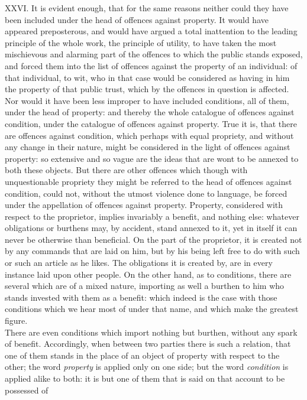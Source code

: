 \documentclass[12pt]{report}
\begin{document}
XXVI. It is evident enough, that for the same reasons neither could they
have been included under the head of offences against property. It would
have appeared preposterous, and would have argued a total inattention to
the leading principle of the whole work, the principle of utility, to
have taken the most mischievous and alarming part of the offences to
which the public stands exposed, and forced them into the list of
offences against the property of an individual: of that individual, to
wit, who in that case would be considered as having in him the property
of that public trust, which by the offences in question is affected.\\
Nor would it have been less improper to have included conditions, all of
them, under the head of property: and thereby the whole catalogue of
offences against condition, under the catalogue of offences against
property. True it is, that there are offences against condition, which
perhaps with equal propriety, and without any change in their nature,
might be considered in the light of offences against property: so
extensive and so vague are the ideas that are wont to be annexed to both
these objects. But there are other offences which though with
unquestionable propriety they might be referred to the head of offences
against condition, could not, without the utmost violence done to
language, be forced under the appellation of offences against property.
Property, considered with respect to the proprietor, implies invariably
a benefit, and nothing else: whatever obligations or burthens may, by
accident, stand annexed to it, yet in itself it can never be otherwise
than beneficial. On the part of the proprietor, it is created not by any
commands that are laid on him, but by his being left free to do with
such or such an article as he likes. The obligations it is created by,
are in every instance laid upon other people. On the other hand, as to
conditions, there are several which are of a mixed nature, importing as
well a burthen to him who stands invested with them as a benefit: which
indeed is the case with those conditions which we hear most of under
that name, and which make the greatest figure.\\
There are even conditions which import nothing but burthen, without any
spark of benefit. Accordingly, when between two parties there is such a
relation, that one of them stands in the place of an object of property
with respect to the other; the word \emph{property} is applied only on
one side; but the word \emph{condition} is applied alike to both: it is
but one of them that is said on that account to be possessed of
\end{document}
